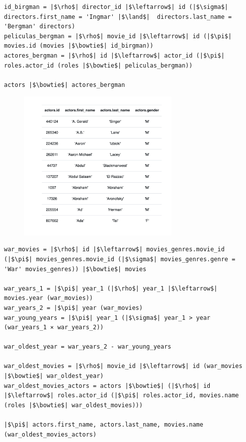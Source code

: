 \documentclass[11pt]{article}
\begin{document}
\begin{verbatim}
id_birgman = |$\rho$| director_id |$\leftarrow$| id (|$\sigma$| directors.first_name = 'Ingmar' |$\land$|  directors.last_name = 'Bergman' directors)
peliculas_bergman = |$\rho$| movie_id |$\leftarrow$| id (|$\pi$| movies.id (movies |$\bowtie$| id_birgman))
actores_bergman = |$\rho$| id |$\leftarrow$| actor_id (|$\pi$| roles.actor_id (roles |$\bowtie$| peliculas_bergman))

actors |$\bowtie$| actores_bergman
\end{verbatim}

\begin{figure}[H]
\includegraphics[width=0.7\textwidth]{Parcialito3/result3}
\end{figure}

\begin{verbatim}
war_movies = |$\rho$| id |$\leftarrow$| movies_genres.movie_id (|$\pi$| movies_genres.movie_id (|$\sigma$| movies_genres.genre = 'War' movies_genres)) |$\bowtie$| movies

war_years_1 = |$\pi$| year_1 (|$\rho$| year_1 |$\leftarrow$| movies.year (war_movies))
war_years_2 = |$\pi$| year (war_movies)
war_young_years = |$\pi$| year_1 (|$\sigma$| year_1 > year (war_years_1 ⨯ war_years_2))

war_oldest_year = war_years_2 - war_young_years

war_oldest_movies = |$\rho$| movie_id |$\leftarrow$| id (war_movies |$\bowtie$| war_oldest_year)
war_oldest_movies_actors = actors |$\bowtie$| (|$\rho$| id |$\leftarrow$| roles.actor_id (|$\pi$| roles.actor_id, movies.name (roles |$\bowtie$| war_oldest_movies)))

|$\pi$| actors.first_name, actors.last_name, movies.name (war_oldest_movies_actors)
\end{verbatim}
\end{document}
